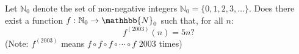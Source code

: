 \documentclass[varwidth]{standalone}
\begin{document}
    Let $\mathbb{N}_0$ denote the set of non-negative integers $\mathbb{N}_0 = \{0, 1, 2, 3, \dots\}$. Does there exist a function $f: \mathbb{N}_0 \to \mathhbb{N}_0$ such that, for all $n$:
    \[
        f^{(2003)}(n) = 5n?  
    \]
    (Note: $f^{(2003)}$ means $f \circ f \circ f \circ \dotsb \circ f$ $2003$ times)
\end{document}
